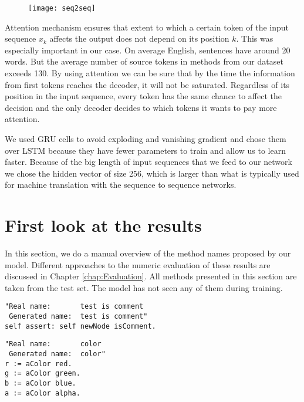 \begin{figure}[H]
    \label{fig:seq2seq}
    \centering
    \texttt{[image: seq2seq]}
\end{figure}

Attention mechanism ensures that extent to which a certain token of the input sequence $x_k$ affects the output does not depend on its position $k$. This was especially important in our case. On average English, sentences have around 20 words. But the average number of source tokens in methods from our dataset exceeds 130. By using attention we can be sure that by the time the information from first tokens reaches the decoder, it will not be saturated. Regardless of its position in the input sequence, every token has the same chance to affect the decision and the only decoder decides to which tokens it wants to pay more attention.

We used GRU cells to avoid exploding and vanishing gradient and chose them over LSTM because they have fewer parameters to train and allow us to learn faster. Because of the big length of input sequences that we feed to our network we chose the hidden vector of size 256, which is larger than what is typically used for machine translation with the sequence to sequence networks.

\section{First look at the results}
\label{sec:TranslatingCode-Results}

In this section, we do a manual overview of the method names proposed by our model. Different approaches to the numeric evaluation of these results are discussed in Chapter \ref{chap:Evaluation}. All methods presented in this section are taken from the test set. The model has not seen any of them during training.


\begin{lstlisting}
"Real name:       test is comment
 Generated name:  test is comment"
self assert: self newNode isComment.
\end{lstlisting}

\begin{lstlisting}
"Real name:       color
 Generated name:  color"
r := aColor red.
g := aColor green.
b := aColor blue.
a := aColor alpha.
\end{lstlisting}

